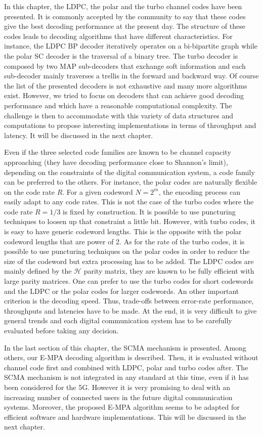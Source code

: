 In this chapter, the LDPC, the polar and the turbo channel codes have been
presented. It is commonly accepted by the community to say that these codes
give the best decoding performance at the present day. The structure of these
codes leads to decoding algorithms that have different characteristics. For
instance, the LDPC BP decoder iteratively operates on a bi-bipartite graph
while the polar SC decoder is the traversal of a binary tree. The turbo decoder
is composed by two MAP sub-decoders that exchange soft information and each
sub-decoder mainly traverses a trellis in the forward and backward way.
Of course the list of the presented decoders is not exhaustive and many more
algorithms exist. However, we tried to focus on decoders that can achieve good
decoding performance and which have a reasonable computational complexity. The
challenge is then to accommodate with this variety of data structures and
computations to propose interesting implementations in terms of throughput and
latency. It will be discussed in the next chapter.

Even if the three selected code families are known to be channel capacity
approaching (they have decoding performance close to Shannon's limit),
depending on the constraints of the digital communication system, a code family
can be preferred to the others. For instance, the polar codes are naturally
flexible on the code rate $R$. For a given codeword $N = 2^m$, the encoding
process can easily adapt to any code rates. This is not the case of the turbo
codes where the code rate $R = 1/3$ is fixed by construction. It is possible to
use puncturing techniques to loosen up that constraint a little bit. However,
with turbo codes, it is easy to have generic codeword lengths. This is the
opposite with the polar codeword lengths that are power of 2. As for the rate
of the turbo codes, it is possible to use puncturing techniques on the polar
codes in order to reduce the size of the codeword but extra processing has to be
added. The LDPC codes are mainly defined by the $\mathcal{H}$ parity matrix,
they are known to be fully efficient with large parity matrices. One can prefer
to use the turbo codes for short codewords and the LDPC or the polar codes for
larger codewords. An other important criterion is the decoding speed. Thus,
trade-offs between error-rate performance, throughputs and latencies have to be
made. At the end, it is very difficult to give general trends and each digital
communication system has to be carefully evaluated before taking any decision.

In the last section of this chapter, the SCMA mechanism is presented. Among
others, our E-MPA decoding algorithm is described. Then, it is evaluated without
channel code first and combined with LDPC, polar and turbo codes after. The
SCMA mechanism is not integrated in any standard at this time, even if it has
been considered for the 5G. However it is very promising to deal with an
increasing number of connected users in the future digital communication
systems. Moreover, the proposed E-MPA algorithm seems to be adapted for
efficient software and hardware implementations. This will be discussed in the
next chapter.
